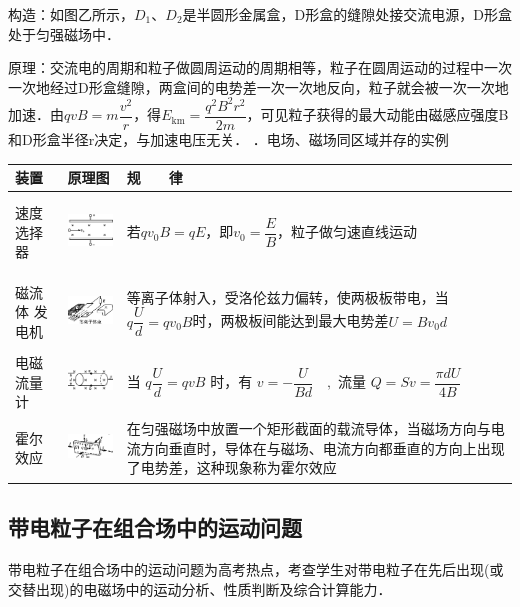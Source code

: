 构造：如图乙所示，$D_1$、$D_2$是半圆形金属盒，D形盒的缝隙处接交流电源，D形盒处于匀强磁场中．

原理：交流电的周期和粒子做圆周运动的周期相等，粒子在圆周运动的过程中一次一次地经过D形盒缝隙，两盒间的电势差一次一次地反向，粒子就会被一次一次地加速．由$q v B=m \dfrac{v^{2}}{r}$，得$E_{\mathrm{km}}=\dfrac{q^{2} B^{2} r^{2}}{2 m}$，可见粒子获得的最大动能由磁感应强度B和D形盒半径r决定，与加速电压无关．
．电场、磁场同区域并存的实例

\begin{longtable}[]{@{}m{2.2cm}m{3cm}m{6cm}@{}}
\toprule
装置 & 原理图 & 规　　律\tabularnewline
\midrule
\endhead

速度
选择器
&
\includegraphics[width=1.05694in,height=0.75486in]{media/image371.png}
&
若$q v_{0} B=q E$，即$v_{0}=\dfrac{E}{B}$，粒子做匀速直线运动
\tabularnewline

磁流体
发电机
&
\includegraphics[width=1.13194in,height=0.69792in]{media/image372.png}
&
等离子体射入，受洛伦兹力偏转，使两极板带电，当$q \dfrac{U}{d}=q v_{0} B$时，两极板间能达到最大电势差$U=Bv_0d$
\tabularnewline
电磁
流量计
&
\includegraphics[width=1in,height=0.44306in]{media/image373.png}
&
当 $q \dfrac{U}{d}=q v B$ 时，有 $v=-\dfrac{U}{B d} \quad,$ 流量 $Q=S v=\dfrac{\pi d U}{4 B}$
\tabularnewline
霍尔
效应
&
\includegraphics[width=1.09444in,height=0.60347in]{media/image374.png}
&
在匀强磁场中放置一个矩形截面的载流导体，当磁场方向与电流方向垂直时，导体在与磁场、电流方向都垂直的方向上出现了电势差，这种现象称为霍尔效应
\tabularnewline
\bottomrule
\end{longtable}
\newpage
\subsection{带电粒子在组合场中的运动问题}
带电粒子在组合场中的运动问题为高考热点，考查学生对带电粒子在先后出现(或交替出现)的电磁场中的运动分析、性质判断及综合计算能力．

